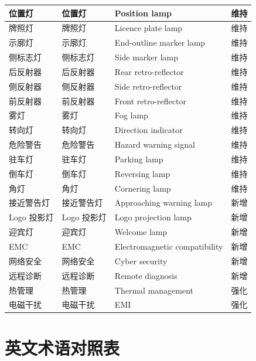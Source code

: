 \begin{table}[H]
\begin{tabularx}{\textwidth}{|X|X|X|X|}
\hline
位置灯       & 位置灯       & Position lamp          & 维持 \\
\hline
牌照灯       & 牌照灯       & Licence plate lamp     & 维持 \\
\hline
示廓灯       & 示廓灯       & End-outline marker lamp & 维持 \\
\hline
侧标志灯     & 侧标志灯     & Side marker lamp       & 维持 \\
\hline
后反射器     & 后反射器     & Rear retro-reflector   & 维持 \\
\hline
侧反射器     & 侧反射器     & Side retro-reflector   & 维持 \\
\hline
前反射器     & 前反射器     & Front retro-reflector   & 维持 \\
\hline
雾灯        & 雾灯        & Fog lamp              & 维持 \\
\hline
转向灯       & 转向灯       & Direction indicator    & 维持 \\
\hline
危险警告     & 危险警告     & Hazard warning signal  & 维持 \\
\hline
驻车灯       & 驻车灯       & Parking lamp           & 维持 \\
\hline
倒车灯       & 倒车灯       & Reversing lamp         & 维持 \\
\hline
角灯        & 角灯        & Cornering lamp         & 维持 \\
\hline
接近警告灯    & 接近警告灯    & Approaching warning lamp & 新增 \\
\hline
Logo 投影灯   & Logo 投影灯   & Logo projection lamp   & 新增 \\
\hline
迎宾灯       & 迎宾灯       & Welcome lamp           & 新增 \\
\hline
EMC       & EMC       & Electromagnetic compatibility & 新增 \\
\hline
网络安全     & 网络安全     & Cyber security         & 新增 \\
\hline
远程诊断     & 远程诊断     & Remote diagnosis       & 新增 \\
\hline
热管理       & 热管理       & Thermal management     & 强化 \\
\hline
电磁干扰     & 电磁干扰     & EMI                  & 强化 \\
\hline
\end{tabularx}
\end{table}

\section{英文术语对照表}

